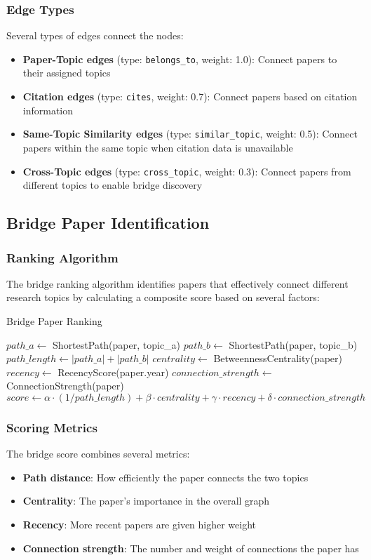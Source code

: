 \documentclass[11pt,a4paper]{article}
\begin{document}
\subsubsection{Edge Types}
Several types of edges connect the nodes:
\begin{itemize}
    \item \textbf{Paper-Topic edges} (type: \texttt{belongs\_to}, weight: 1.0): Connect papers to their assigned topics
    \item \textbf{Citation edges} (type: \texttt{cites}, weight: 0.7): Connect papers based on citation information
    \item \textbf{Same-Topic Similarity edges} (type: \texttt{similar\_topic}, weight: 0.5): Connect papers within the same topic when citation data is unavailable
    \item \textbf{Cross-Topic edges} (type: \texttt{cross\_topic}, weight: 0.3): Connect papers from different topics to enable bridge discovery
\end{itemize}

\subsection{Bridge Paper Identification}

\subsubsection{Ranking Algorithm}
The bridge ranking algorithm identifies papers that effectively connect different research topics by calculating a composite score based on several factors:

\begin{algorithm}[H]
\SetAlgoLined
\caption{Bridge Paper Ranking}
$path\_a \gets$ ShortestPath(paper, topic\_a)\;
$path\_b \gets$ ShortestPath(paper, topic\_b)\;
$path\_length \gets |path\_a| + |path\_b|$\;
$centrality \gets$ BetweennessCentrality(paper)\;
$recency \gets$ RecencyScore(paper.year)\;
$connection\_strength \gets$ ConnectionStrength(paper)\;
$score \gets \alpha \cdot (1/path\_length) + \beta \cdot centrality + \gamma \cdot recency + \delta \cdot connection\_strength$\;
\;
\end{algorithm}

\subsubsection{Scoring Metrics}
The bridge score combines several metrics:
\begin{itemize}
    \item \textbf{Path distance}: How efficiently the paper connects the two topics
    \item \textbf{Centrality}: The paper's importance in the overall graph
    \item \textbf{Recency}: More recent papers are given higher weight
    \item \textbf{Connection strength}: The number and weight of connections the paper has
\end{itemize}
\end{document}
